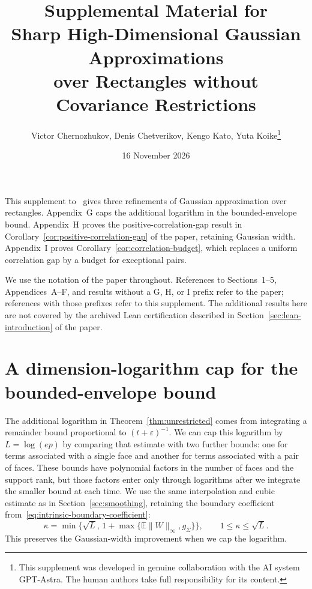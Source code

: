 \documentclass[11pt,letterpaper,twoside,leqno]{article}
\title{\Large Supplemental Material for\\[0.5em]
Sharp High-Dimensional Gaussian Approximations\\[0.15em]
over Rectangles without Covariance Restrictions}
\author{\normalsize Victor Chernozhukov, Denis Chetverikov, Kengo Kato, Yuta
Koike\thanks{This supplement was developed in genuine collaboration
with the AI system GPT-Astra. The human authors take full
responsibility for its content.}}
\date{\normalsize 16 November 2026}
\theoremstyle{bookplain}
\theoremstyle{bookremark}
\newcommand{\E}{\mathbb E}
\begin{document}
\renewcommand{\thepage}{S\arabic{page}}
\maketitle

This supplement to~\cite{MainPaper2026} gives three refinements of
Gaussian approximation over rectangles. Appendix~G caps the additional
logarithm in the bounded-envelope bound. Appendix~H proves the
positive-correlation-gap result in Corollary~\ref{cor:positive-correlation-gap}
of the paper, retaining Gaussian width. Appendix~I proves
Corollary~\ref{cor:correlation-budget}, which replaces a uniform
correlation gap by a budget for exceptional pairs.

We use the notation of the paper throughout. References to
Sections~1--5, Appendices~A--F, and results without a G, H, or I prefix
refer to the paper; references with those prefixes refer to this
supplement. The additional results here are not covered by the
archived Lean certification described in Section~\ref{sec:lean-introduction}
of the paper.

\begingroup
\setcounter{tocdepth}{1}
\small
\tableofcontents
\endgroup
\clearpage
\appendix
\setcounter{section}{6}

\section{A dimension-logarithm cap for the bounded-envelope bound}
\label{app:dimension-cap}

The additional logarithm in Theorem~\ref{thm:unrestricted} comes
from integrating a remainder bound proportional to
$(t+\varepsilon)^{-1}$. We can cap this logarithm by
$L=\log(ep)$ by comparing that estimate with two further bounds:
one for terms associated with a single face and another for terms
associated with a pair of faces. These bounds have polynomial
factors in the number of faces and the support rank, but those
factors enter only through logarithms after we integrate the
smaller bound at each time. We use the same interpolation and
cubic estimate as in Section~\ref{sec:smoothing}, retaining the
boundary coefficient from~\eqref{eq:intrinsic-boundary-coefficient}:
\[
 \kappa=\min\{\sqrt L,\,1+\max\{\E\|W\|_\infty,g_\Sigma\}\},
 \qquad 1\le\kappa\le\sqrt L.
\]
This preserves the Gaussian-width improvement when we cap the logarithm.
\end{document}
